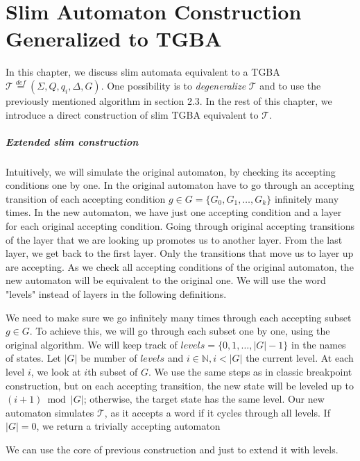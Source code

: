 \documentclass[
	digital,
nolof, nolot
]{fithesis3}
\newcommand{\cT}{\mathcal{T}}
\newcommand{\eqdef}{\overset{def}{=}}
\begin{document}
			
	\chapter{Slim Automaton Construction Generalized to TGBA} \label{section:gslim}
			In this chapter, we discuss slim automata equivalent to a TGBA $\cT\eqdef(\Sigma, Q, q_i, \Delta, G)$.
			One possibility is to \emph{degeneralize} $\cT$ and to use the previously mentioned algorithm in section 2.3.
			In the rest of this chapter, we introduce a direct construction of slim TGBA equivalent to $\cT$.
			\paragraph{Extended slim construction}
			Intuitively, we will simulate the original automaton, by checking its accepting conditions one by one. In the original automaton have to go through an accepting transition of each accepting condition $g \in G=\{G_0, G_1, \ldots, G_k\}$ infinitely many times.
			In the new automaton, we have just one accepting condition and a layer for each original accepting condition. Going through original accepting transitions of the layer that we are looking up promotes us to another layer. From the last layer, we get back to the first layer. Only the transitions that move us to layer up are accepting. As we check all accepting conditions of the original automaton, the new automaton will be equivalent to the original one. We will use the word "levels" instead of layers in the following definitions.
			
			
			We need to make sure we go infinitely many times through each accepting subset $g \in G$.
			To achieve this, we will go through each subset one by one, using the original algorithm. We will keep track of $levels=\{0,1,\ldots,|G|-1\}$ in the names of states. Let $|G|$ be number of $levels$ and $i \in \mathbb{N}, i<|G|$ the current level.
			At each level $i$, we look at $i$th subset of $G$. We use the same steps as in classic breakpoint construction, but on each accepting transition, the new state will be leveled up to $(i+1)\bmod|G|$;
			 otherwise, the target state has the same level. Our new automaton simulates $\cT$, as it accepts a word if it cycles through all levels. If $|G|=0$, we return a trivially accepting automaton
			
			We can use the core of previous construction and just to extend it with levels.
	
\end{document}
